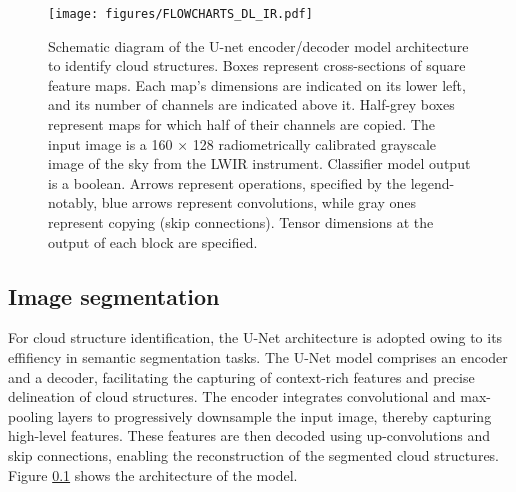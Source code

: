 \documentclass[remotesensing,article,submit,pdftex,moreauthors]{Definitions/mdpi}
\begin{document}
\begin{figure}[H]
	\texttt{[image: figures/FLOWCHARTS\_DL\_IR.pdf]}
	\caption{
		Schematic diagram of the U-net encoder/decoder model architecture to identify cloud structures. Boxes represent cross-sections of square feature maps. Each map's dimensions are indicated on its lower left, and its number of channels are indicated above it. Half-grey boxes represent maps for which half of their channels are copied. The input image is a 160 × 128 radiometrically calibrated grayscale image of the sky from the LWIR instrument. Classifier model output is a boolean. Arrows represent operations, specified by the legend-notably, blue arrows represent convolutions, while gray ones represent copying (skip connections). Tensor dimensions at the output of each block are specified.  \label{fig1}}
	\end{figure}
	\unskip

\subsection{Image segmentation}

For cloud structure identification, the U-Net architecture is adopted owing to its effifiency in semantic segmentation tasks. The U-Net model comprises an encoder and a decoder, facilitating the capturing of context-rich features and precise delineation of cloud structures. The encoder integrates convolutional and max-pooling layers to progressively downsample the input image, thereby capturing high-level features. These features are then decoded using up-convolutions and skip connections, enabling the reconstruction of the segmented cloud structures. Figure \ref{} shows the architecture of the model.
\end{document}
